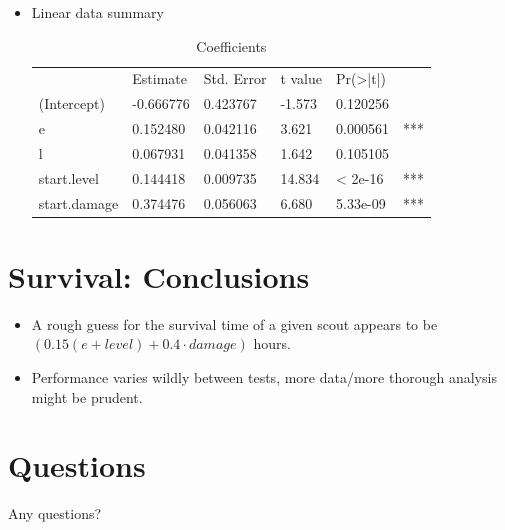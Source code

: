 \documentclass{beamer}
\begin{document}
\begin{frame}
  \begin{itemize}
  \item Linear data summary
    \begin{table}
      \centering
      \caption{Coefficients}
      \begin{tabular}{l|lllll}
        &Estimate& Std. Error& t value& Pr(>|t|)    \\
        (Intercept)  &-0.666776&   0.423767&  -1.573& 0.120256&    \\
        e            & 0.152480&   0.042116&   3.621& 0.000561& ***\\
        l            & 0.067931&   0.041358&   1.642& 0.105105&    \\
        start.level  & 0.144418&   0.009735&  14.834&  < 2e-16& ***\\
        start.damage & 0.374476&   0.056063&   6.680& 5.33e-09& ***\\
      \end{tabular}
    \end{table}
  \end{itemize}
\end{frame}


\section{Survival: Conclusions}
\begin{frame}
  \begin{itemize}
  \item A rough guess for the survival time of a given scout appears to be $(0.15(e+level)+0.4\cdot damage)$ hours.
  \item Performance varies wildly between tests, more data/more thorough analysis might be prudent.
  \end{itemize}
\end{frame}

\section{Questions}
\begin{frame}
\centering
  
  {\Huge Any questions?}


\end{frame}
\end{document}
